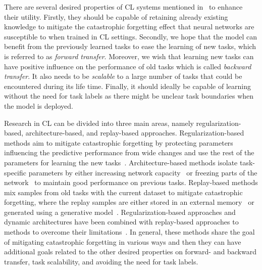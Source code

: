 There are several desired properties of CL systems mentioned in~\cite{schwarz2018progress} to enhance their utility. Firstly, they should be capable of retaining already existing knowledge to mitigate the catastrophic forgetting effect that neural networks are susceptible to when trained in CL settings. Secondly, we hope that the model can benefit from the previously learned tasks to ease the learning of new tasks, which is referred to as \textit{forward transfer}. Moreover, we wish that learning new tasks can have positive influence on the performance of old tasks which is called \textit{backward transfer}. It also needs to be \textit{scalable} to a large number of tasks that could be encountered during its life time. Finally, it should ideally be capable of learning without the need for task labels as there might be unclear task boundaries when the model is deployed. 

Research in CL can be divided into three main areas, namely regularization-based, architecture-based, and replay-based approaches. Regularization-based methods aim to mitigate catastrophic forgetting by protecting parameters influencing the predictive performance from wide changes and use the rest of the parameters for learning the new tasks~\cite{adel2019continual, chaudhry2018riemannian, kirkpatrick2017overcoming, li2017learning, nguyen2017variational, rannen2017encoder, schwarz2018progress, zenke2017continual}. Architecture-based methods isolate task-specific parameters by either increasing network capacity~\cite{rusu2016progressive, yoon2019scalable, yoon2017lifelong} or freezing parts of the network~\cite{mallya2018packnet, serra2018overcoming} to maintain good performance on previous tasks. 
Replay-based methods mix samples from old tasks with the current dataset to mitigate catastrophic forgetting, where the replay samples are either stored in an external memory~\cite{chaudhry2019tiny, hayes2020remind, isele2018selective, lopez2017gradient} or generated using a generative model~\cite{shin2017continual, van2018generative}. 
Regularization-based approaches and dynamic architectures have been combined with replay-based approaches to methods to overcome their limitations~\cite{chaudhry2018riemannian, chaudhry2018efficient, douillard2020podnet, ebrahimi2020adversarial, joseph2020meta, mirzadeh2020linear, nguyen2017variational, pan2020continual, pellegrini2019latent, rolnick2018experience, von2019continual}. In general, these methods share the goal of mitigating catastrophic forgetting in various ways and then they can have additional goals related to the other desired properties on forward- and backward transfer, task scalability, and avoiding the need for task labels. 